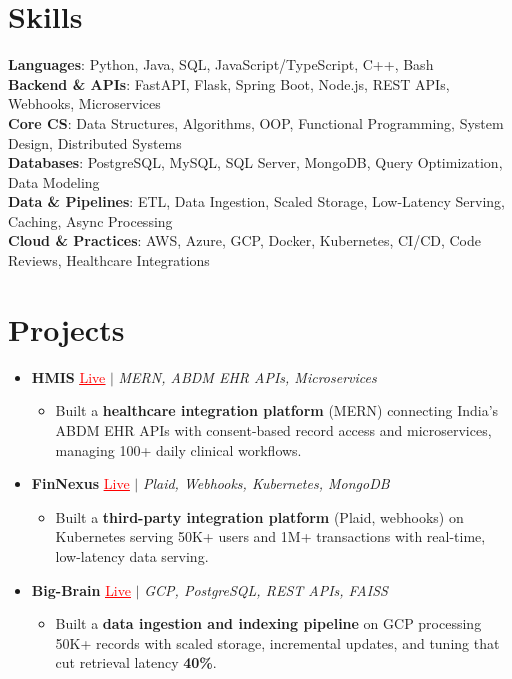 \documentclass[letterpaper,10pt]{article}
\newcommand{\resumeItem}[1]{\item\small{{#1 \vspace{-2pt}}}}
\newcommand{\resumeProjectHeading}[1]{\item \small #1 \vspace{-2pt}}
\newcommand{\resumeSubHeadingListStart}{\begin{itemize}[leftmargin=0.0in, label={}]}
\newcommand{\resumeSubHeadingListEnd}{\end{itemize}}
\newcommand{\resumeProjItemListStart}{\begin{itemize}[leftmargin=0.15in,label=\textbullet,itemsep=0pt,topsep=0pt,parsep=0pt,partopsep=0pt]}
\newcommand{\resumeProjItemListEnd}{\end{itemize}\vspace{-4pt}}
\begin{document}
\section{Skills}
\begin{itemize}[leftmargin=0.15in, label={}]
\small{\item{
\textbf{Languages}: Python, Java, SQL, JavaScript/TypeScript, C++, Bash \\
\textbf{Backend \& APIs}: FastAPI, Flask, Spring Boot, Node.js, REST APIs, Webhooks, Microservices \\
\textbf{Core CS}: Data Structures, Algorithms, OOP, Functional Programming, System Design, Distributed Systems \\
\textbf{Databases}: PostgreSQL, MySQL, SQL Server, MongoDB, Query Optimization, Data Modeling \\
\textbf{Data \& Pipelines}: ETL, Data Ingestion, Scaled Storage, Low-Latency Serving, Caching, Async Processing \\
\textbf{Cloud \& Practices}: AWS, Azure, GCP, Docker, Kubernetes, CI/CD, Code Reviews, Healthcare Integrations
}}
\end{itemize}
\vspace{-6pt}
\section{Projects}
\resumeSubHeadingListStart
\vspace{-2pt}
\resumeProjectHeading{\textbf{HMIS} {\href{https://hims-rouge.vercel.app/}{\textcolor{red}{\underline{Live}}}} $|$ \emph{MERN, ABDM EHR APIs, Microservices}}
\resumeProjItemListStart
\resumeItem{Built a \textbf{healthcare integration platform} (MERN) connecting India's ABDM EHR APIs with consent-based record access and microservices, managing 100+ daily clinical workflows.}
\resumeProjItemListEnd
\vspace{3pt}
\resumeProjectHeading{\textbf{FinNexus} {\href{https://fin-nexus.vercel.app/}{\textcolor{red}{\underline{Live}}}} $|$ \emph{Plaid, Webhooks, Kubernetes, MongoDB}}
\resumeProjItemListStart
\resumeItem{Built a \textbf{third-party integration platform} (Plaid, webhooks) on Kubernetes serving 50K+ users and 1M+ transactions with real-time, low-latency data serving.}
\resumeProjItemListEnd
\vspace{3pt}
\resumeProjectHeading{\textbf{Big-Brain} {\href{https://big-brain-pied.vercel.app/}{\textcolor{red}{\underline{Live}}}} $|$ \emph{GCP, PostgreSQL, REST APIs, FAISS}}
\resumeProjItemListStart
\resumeItem{Built a \textbf{data ingestion and indexing pipeline} on GCP processing 50K+ records with scaled storage, incremental updates, and tuning that cut retrieval latency \textbf{40\%}.}
\resumeProjItemListEnd
\resumeSubHeadingListEnd
\end{document}
